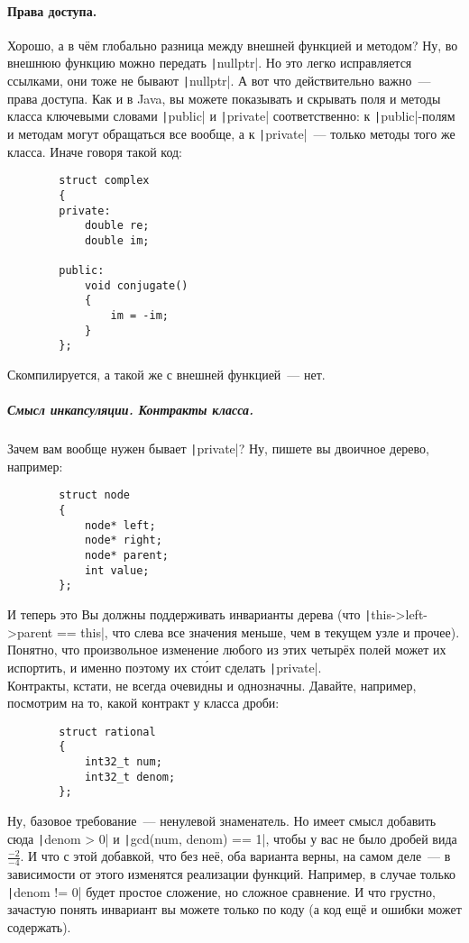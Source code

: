 \documentclass{article}
\begin{document}
    \paragraph{Права доступа.}
    Хорошо, а в чём глобально разница между внешней функцией и методом? Ну, во внешнюю функцию можно передать \texttt|nullptr|. Но это легко исправляется ссылками, они тоже не бывают \texttt|nullptr|. А вот что действительно важно~--- права доступа. Как и в Java, вы можете показывать и скрывать поля и методы класса ключевыми словами \texttt|public| и \texttt|private| соответственно: к \texttt|public|-полям и методам могут обращаться все вообще, а к \texttt|private|~--- только методы того же класса. Иначе говоря такой код:
    \begin{verbatim}
        struct complex
        {
        private:
            double re;
            double im;

        public:
            void conjugate()
            {
                im = -im;
            }
        };
    \end{verbatim}
    Скомпилируется, а такой же с внешней функцией~--- нет.
    \subparagraph{Смысл инкапсуляции. Контракты класса.}
    Зачем вам вообще нужен бывает \texttt|private|? Ну, пишете вы двоичное дерево, например:
    \begin{verbatim}
        struct node
        {
            node* left;
            node* right;
            node* parent;
            int value;
        };
    \end{verbatim}
    И теперь это Вы должны поддерживать инварианты дерева (что \texttt|this->left->parent == this|, что слева все значения меньше, чем в текущем узле и прочее). Понятно, что произвольное изменение любого из этих четырёх полей может их испортить, и именно поэтому их ст\'{о}ит сделать \texttt|private|.\\
    Контракты, кстати, не всегда очевидны и однозначны. Давайте, например, посмотрим на то, какой контракт у класса дроби:
    \begin{verbatim}
        struct rational
        {
            int32_t num;
            int32_t denom;
        };
    \end{verbatim}
    Ну, базовое требование~--- ненулевой знаменатель. Но имеет смысл добавить сюда \texttt|denom > 0| и \texttt|gcd(num, denom) == 1|, чтобы у вас не было дробей вида $\frac{-2}{-4}$. И что с этой добавкой, что без неё, оба варианта верны, на самом деле~--- в зависимости от этого изменятся реализации функций. Например, в случае только \texttt|denom != 0| будет простое сложение, но сложное сравнение. И что грустно, зачастую понять инвариант вы можете только по коду (а код ещё и ошибки может содержать).\\
\end{document}
